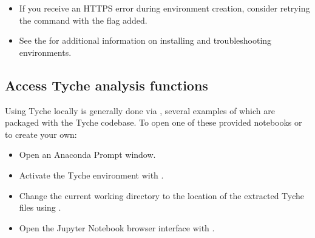\documentclass[letterpaper,10pt,english]{sphinxmanual}
\begin{document}
\begin{sphinxVerbatim}[commandchars=\\\{\}]
   
\end{sphinxVerbatim}
\begin{itemize}
\item {} 
\sphinxAtStartPar
If you receive an HTTPS error during environment creation, consider retrying the command with the  flag added.

\item {} 
\sphinxAtStartPar
See the  for additional information on installing and troubleshooting environments.

\end{itemize}


\subsection{Access Tyche analysis functions}
\label{\detokenize{cheat-sheet:access-tyche-analysis-functions}}
\sphinxAtStartPar
Using Tyche locally is generally done via , several examples of which are packaged with the Tyche codebase. To open one of these provided notebooks or to create your own:
\begin{itemize}
\item {} 
\sphinxAtStartPar
Open an Anaconda Prompt window.

\item {} 
\sphinxAtStartPar
Activate the Tyche environment with .

\item {} 
\sphinxAtStartPar
Change the current working directory to the location of the extracted Tyche files using .

\item {} 
\sphinxAtStartPar
Open the Jupyter Notebook browser interface with .

\end{itemize}
\end{document}
